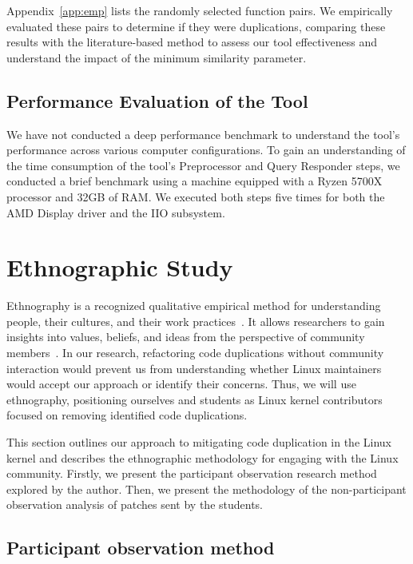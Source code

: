 Appendix~\ref{app:emp} lists the randomly selected function pairs. We empirically evaluated these pairs to determine if they were duplications, comparing these results with the literature-based method to assess our tool effectiveness and understand the impact of the minimum similarity parameter.

\subsection{Performance Evaluation of the Tool}

We have not conducted a deep performance benchmark to understand the tool's performance across various 
computer configurations. To gain an understanding of the time consumption of the tool's Preprocessor and 
Query Responder steps, we conducted a brief benchmark using a machine equipped with a Ryzen 5700X processor 
and 32GB of RAM. We executed both steps five times for both the AMD Display driver and the IIO subsystem.

\section{Ethnographic Study}
\label{sec:meteth}

Ethnography is a recognized qualitative empirical method for understanding people, 
their cultures, and their work practices~\citep{bookethno}. It allows researchers 
to gain insights into values, beliefs, and ideas from the perspective of community 
members~\citep{ethnosoft}. In our research, refactoring code duplications without 
community interaction would prevent us from understanding whether Linux maintainers 
would accept our approach or identify their concerns. Thus, we will use ethnography, 
positioning ourselves and students as Linux kernel contributors focused on removing 
identified code duplications.

This section outlines our approach to mitigating code duplication in the Linux kernel 
and describes the ethnographic methodology for engaging with the Linux community. 
Firstly, we present the participant observation research method explored by the author. 
Then, we present the methodology of the non-participant observation analysis of patches 
sent by the students.

\subsection{Participant observation method}
\label{subsec:partmethod}

